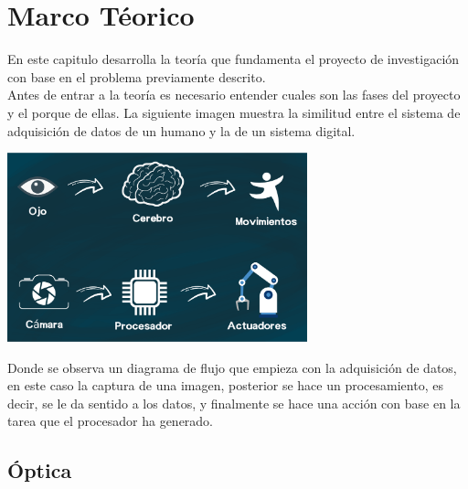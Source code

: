 \chapter{Marco Téorico}


En este capitulo desarrolla la teoría que fundamenta el proyecto de investigación con base
en el problema previamente descrito.\\
Antes de entrar a la teoría es necesario entender cuales son las fases del proyecto y
el porque de ellas.
La siguiente imagen muestra la similitud entre el sistema de adquisición de datos
de un humano y la de un sistema digital.
\begin{center}
	\includegraphics[width=0.65\textwidth]{Contenido/Cuerpo/Capitulo2/Fig1.eps}
	\label{fig:MarcoTeorico:Fig1}
\end{center}
Donde se observa un diagrama de flujo que empieza con la adquisición de datos, en este
caso la captura de una imagen, posterior se hace un procesamiento, es decir, se le da
sentido a los datos, y finalmente se hace una acción con base en la tarea que el procesador
ha generado.


\section{Óptica}

